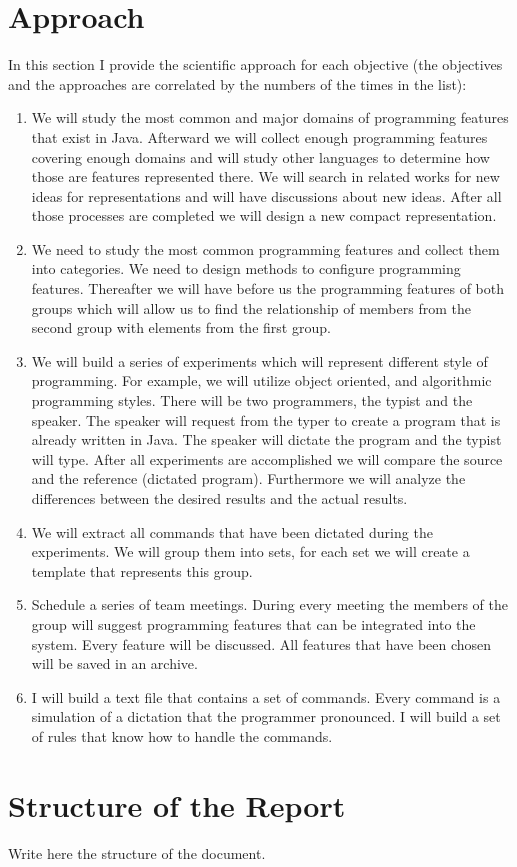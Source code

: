 \section{Approach}
In this section I provide the scientific approach for each objective (the objectives and the approaches are correlated by the numbers of the times in the list):
\begin{enumerate}
	\item We will study the most common and major domains of programming features that exist in Java. Afterward we will collect enough programming features covering enough domains and will study other languages to determine how those are features represented there. We will search in related works for new ideas for representations and will have discussions about new ideas. After all those processes are completed we will design a new compact representation.
	\item We need to study the most common programming features and collect them into categories. We need to design methods to configure programming features. Thereafter we will have before us the programming features of both groups which will allow us to find the relationship of members from the second group with elements from the first group.
	\item We will build a series of experiments which will represent different style of programming. For example, we will utilize object oriented, and algorithmic programming styles. There will be two programmers, the typist and the speaker. The speaker will request from the typer to create a program that is already written in Java. The speaker will dictate the program and the typist will type. After all experiments are accomplished we will compare the source and the reference (dictated program). Furthermore we will analyze the differences between the desired results and the actual results.
	\item We will extract all commands that have been dictated during the experiments. We will group them into sets, for each set we will create a template that represents this group.
	\item Schedule a series of team meetings. During every meeting the members of the group will suggest programming features that can be integrated into the system. Every feature will be discussed. All features that have been chosen will be saved in an archive.
	\item I will build a text file that contains a set of commands. Every command is a simulation of a dictation that the programmer pronounced. I will build a set of rules that know how to handle the commands.
\end{enumerate}
\section{Structure of the Report}
\begin{remark}
Write here the structure of the document.
\end{remark}